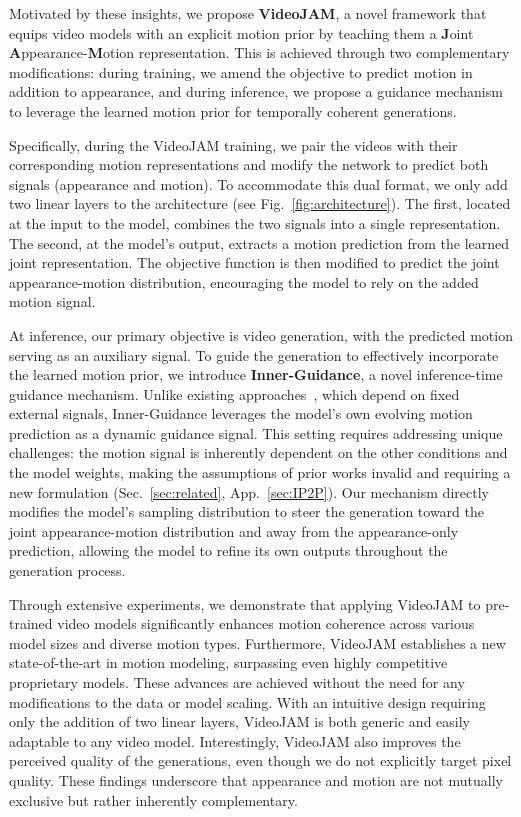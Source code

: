 Motivated by these insights, we propose \textbf{VideoJAM}, a novel framework that equips video models with an explicit motion prior by teaching them a \textbf{J}oint \textbf{A}ppearance-\textbf{M}otion representation. This is achieved through two complementary modifications: during training, we amend the objective to predict motion in addition to appearance, and during inference, we propose a guidance mechanism to leverage the learned motion prior for temporally coherent generations.

Specifically, during the VideoJAM training, we pair the videos with their corresponding motion representations and modify the network to predict both signals (appearance and motion). 
To accommodate this dual format, we only add two linear layers to the architecture (see Fig.~\ref{fig:architecture}). The first, located at the input to the model, combines the two signals into a single representation. The second, at the model's output, extracts a motion prediction from the learned joint representation. The objective function is then modified to predict the joint appearance-motion distribution, encouraging the model to rely on the added motion signal.

At inference, our primary objective is video generation, with the predicted motion serving as an auxiliary signal. To guide the generation to effectively incorporate the learned motion prior, we introduce \textbf{Inner-Guidance}, a novel inference-time guidance mechanism. Unlike existing approaches~\cite{ho2022classifier,brooks2022instructpix2pix}, which depend on fixed external signals, Inner-Guidance leverages the model's own evolving motion prediction as a dynamic guidance signal. This setting requires addressing unique challenges: the motion signal is inherently dependent on the other conditions and the model weights, making the assumptions of prior works invalid and requiring a new formulation (Sec.~\ref{sec:related}, App.~\ref{sec:IP2P}). Our mechanism directly modifies the model's sampling distribution to steer the generation toward the joint appearance-motion distribution and away from the appearance-only prediction, allowing the model to refine its own outputs throughout the generation process. 

Through extensive experiments, we demonstrate that applying VideoJAM to pre-trained video models significantly enhances motion coherence across various model sizes and diverse motion types. Furthermore, VideoJAM establishes a new state-of-the-art in motion modeling, surpassing even highly competitive proprietary models.
These advances are achieved without the need for any modifications to the data or model scaling. With an intuitive design requiring only the addition of two linear layers, VideoJAM is both generic and easily adaptable to any video model.
Interestingly, VideoJAM also improves the perceived quality of the generations, even though we do not explicitly target pixel quality.
These findings underscore that appearance and motion are not mutually exclusive but rather inherently complementary.